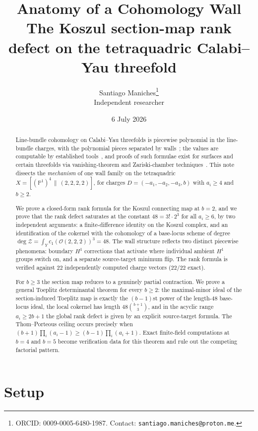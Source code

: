 \documentclass[11pt]{article}
\title{\textbf{Anatomy of a Cohomology Wall}\\[2pt]
\large The Koszul section-map rank defect on the tetraquadric Calabi--Yau threefold}
\author{Santiago Maniches\thanks{ORCID: 0009-0005-6480-1987. Contact: \texttt{santiago.maniches@proton.me}.}\\
\small Independent researcher}
\date{6 July 2026}
\theoremstyle{plain}
\theoremstyle{definition}
\theoremstyle{remark}
\newcommand{\PP}{\mathbb{P}}
\begin{document}
\maketitle

\begin{abstract}
\noindent
Line-bundle cohomology on Calabi--Yau threefolds is piecewise polynomial in the line-bundle charges, with the polynomial pieces separated by walls~\cite{ConstantinLukas2019}; the values are computable by established tools~\cite{cohomCalg}, and proofs of such formulae exist for surfaces and certain threefolds via vanishing-theorem and Zariski-chamber techniques~\cite{BCDL2020,BC2020}. This note dissects the \emph{mechanism} of one wall family on the tetraquadric $X=[(\PP^1)^4\,\|\,(2,2,2,2)]$, for charges $D=(-a_1,-a_2,-a_3,b)$ with $a_i\ge 4$ and $b\ge 2$.

We prove a closed-form rank formula for the Koszul connecting map at $b=2$, and we prove that the rank defect saturates at the constant $48=3!\cdot 2^3$ for all $a_i\ge 6$, by two independent arguments: a finite-difference identity on the Koszul complex, and an identification of the cokernel with the cohomology of a base-locus scheme of degree $\deg\mathcal{Z}=\int_Y c_1(\mathcal{O}(2,2,2))^3=48$. The wall structure reflects two distinct piecewise phenomena: boundary $H^1$ corrections that activate where individual ambient $H^1$ groups switch on, and a separate source-target minimum flip. The rank formula is verified against $22$ independently computed charge vectors ($22/22$ exact).

For $b\ge 3$ the section map reduces to a genuinely partial contraction. We prove a general Toeplitz determinantal theorem for every $b\ge2$: the maximal-minor ideal of the section-induced Toeplitz map is exactly the $(b-1)$st power of the length-$48$ base-locus ideal, the local cokernel has length $48\binom{b+1}{3}$, and in the acyclic range $a_i\ge2b+1$ the global rank defect is given by an explicit source-target formula. The Thom--Porteous ceiling occurs precisely when $(b+1)\prod_i(a_i-1)\ge(b-1)\prod_i(a_i+1)$. Exact finite-field computations at $b=4$ and $b=5$ become verification data for this theorem and rule out the competing factorial pattern.
\end{abstract}

\section{Setup}\label{sec:setup}
\end{document}
